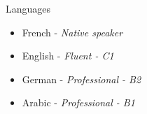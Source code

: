 \vspace{4mm}
\hspace*{-2mm}
{\fontsize{16}{10}\selectfont \hspace{1.5mm} Languages} \newline
\vspace{-5mm}
\begin{itemize}[noitemsep]
    \item[] French - \textit{Native speaker}
    \item[] English - \textit{Fluent - C1}
    \item[] German - \textit{Professional - B2}
    \item[] Arabic - \textit{Professional - B1}
\end{itemize}
\vspace{2mm}
